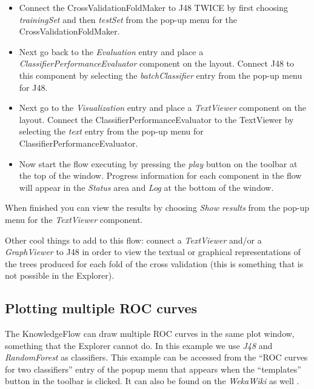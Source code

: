 \begin{itemize}
	\item Connect the CrossValidationFoldMaker to J48 TWICE by first choosing
	\textit{trainingSet} and then \textit{testSet} from the pop-up menu for the
	CrossValidationFoldMaker.

	\item Next go back to the \textit{Evaluation} entry and place
          a \textit{ClassifierPerformanceEvaluator} component on the
          layout. Connect J48 to this component by selecting the
          \textit{batchClassifier} entry from the pop-up menu for J48.

	\item Next go to the \textit{Visualization} entry and place a \textit{TextViewer}
	component on the layout. Connect the ClassifierPerformanceEvaluator to
	the TextViewer by selecting the \textit{text} entry from the pop-up menu for
	ClassifierPerformanceEvaluator.

	\item Now start the flow executing by pressing the
          \textit{play} button on the toolbar at the top of the
          window. Progress information for each component in the flow
          will appear in the \textit{Status} area and \textit{Log} at
          the bottom of the window.
\end{itemize}

When finished you can view the results by choosing \textit{Show results} from
the pop-up menu for the \textit{TextViewer} component.

Other cool things to add to this flow: connect a \textit{TextViewer} and/or a
\textit{GraphViewer} to J48 in order to view the textual or graphical
representations of the trees produced for each fold of the cross
validation (this is something that is not possible in the Explorer).


\newpage
\subsection{Plotting multiple ROC curves}
\label{exampleroc}
The KnowledgeFlow can draw multiple ROC curves in the same plot
window, something that the Explorer cannot do. In this example we use
\textit{J48} and \textit{RandomForest} as classifiers. This example
can be accessed from the ``ROC curves for two classifiers'' entry of
the popup menu that appears when the ``templates'' button in the
toolbar is clicked. It can also be found on the \textit{WekaWiki}
as well \cite{multipleroc}.

